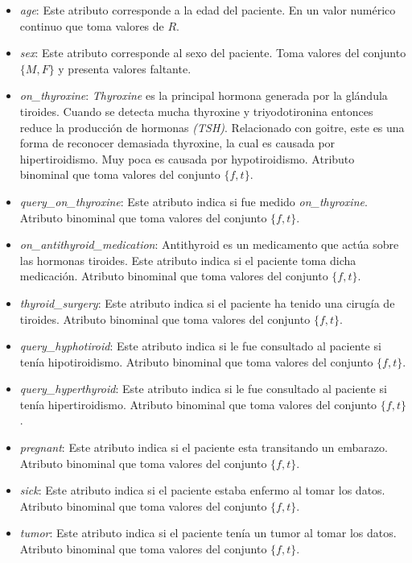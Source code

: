 \documentclass[osajnl,twocolumn,showpacs,superscriptaddress,10pt,floatfix]{revtex4-1} %
\begin{document}
\begin{itemize}
    \item \textit{age}: Este atributo corresponde a la edad del paciente. En un valor numérico continuo que toma valores de $R$.
    \item \textit{sex}: Este atributo corresponde al sexo del paciente. Toma valores del conjunto $\{M, F\}$ y presenta valores faltante.
    \item \textit{on\_thyroxine}:  \textit{Thyroxine} es la principal hormona generada por la glándula tiroides. Cuando se detecta mucha thyroxine y triyodotironina entonces reduce la producción de hormonas \textit{(TSH)}. Relacionado con goitre, este es una forma de reconocer demasiada thyroxine, la cual es causada por hipertiroidismo. Muy poca es causada por hypotiroidismo. Atributo binominal que toma valores del conjunto $\{f, t\}$.
    \item \textit{query\_on\_thyroxine}: Este atributo indica si fue medido \textit{on\_thyroxine}. Atributo binominal que toma valores del conjunto $\{f, t\}$.
    \item \textit{on\_antithyroid\_medication}: Antithyroid es un medicamento que actúa sobre las hormonas tiroides. Este atributo indica si el paciente toma dicha medicación. Atributo binominal que toma valores del conjunto $\{f, t\}$.
    \item \textit{thyroid\_surgery}: Este atributo indica si el paciente ha tenido una cirugía de tiroides. Atributo binominal que toma valores del conjunto $\{f, t\}$.
    \item \textit{query\_hyphotiroid}: Este atributo indica si le fue consultado al paciente si tenía hipotiroidismo. Atributo binominal que toma valores del conjunto $\{f, t\}$.
    \item \textit{query\_hyperthyroid}: Este atributo indica si le fue consultado al paciente si tenía hipertiroidismo. Atributo binominal que toma valores del conjunto $\{f, t\}$.
    \item \textit{pregnant}: Este atributo indica si el paciente esta transitando un embarazo. Atributo binominal que toma valores del conjunto $\{f, t\}$.
    \item \textit{sick}: Este atributo indica si el paciente estaba enfermo al tomar los datos. Atributo binominal que toma valores del conjunto $\{f, t\}$.
    \item \textit{tumor}: Este atributo indica si el paciente tenía un tumor al tomar los datos. Atributo binominal que toma valores del conjunto $\{f, t\}$.

\end{itemize}
\end{document}

